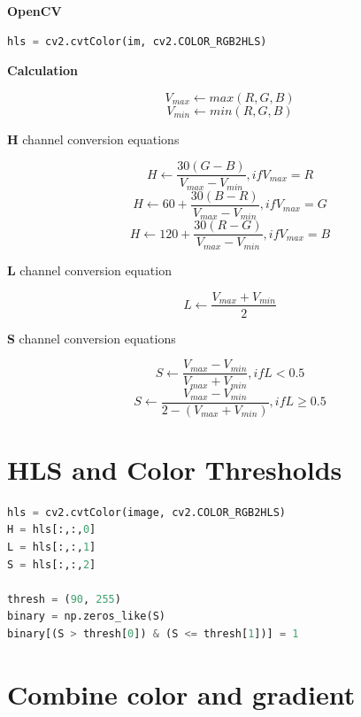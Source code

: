 \documentclass[12pt]{article}
\begin{document}
\textbf{OpenCV}

\begin{lstlisting}[language=Python]
hls = cv2.cvtColor(im, cv2.COLOR_RGB2HLS)
\end{lstlisting}

\textbf{Calculation}

$$V_{max} \leftarrow max(R, G, B)$$
$$V_{min} \leftarrow min(R, G, B)$$

\textbf{H} channel conversion equations

$$H \leftarrow \frac{30(G-B)}{V_{max}-V_{min}}, if V_{max} = R$$
$$H \leftarrow 60 + \frac{30(B-R)}{V_{max}-V_{min}}, if V_{max} = G$$
$$H \leftarrow 120 + \frac{30(R-G)}{V_{max}-V_{min}}, if V_{max} = B$$

\textbf{L} channel conversion equation

$$L \leftarrow \frac{V_{max} + V_{min}}{2}$$

\textbf{S} channel conversion equations

$$S \leftarrow \frac{V_{max} - V_{min}}{V_{max} + V_{min}}, if L < 0.5$$
$$S \leftarrow \frac{V_{max} - V_{min}}{2 - (V_{max} + V_{min})}, if L \geq 0.5$$

\section{HLS and Color Thresholds}

\begin{lstlisting}[language=Python]
hls = cv2.cvtColor(image, cv2.COLOR_RGB2HLS)
H = hls[:,:,0]
L = hls[:,:,1]
S = hls[:,:,2]

thresh = (90, 255)
binary = np.zeros_like(S)
binary[(S > thresh[0]) & (S <= thresh[1])] = 1
\end{lstlisting}

\section{Combine color and gradient}
\end{document}
